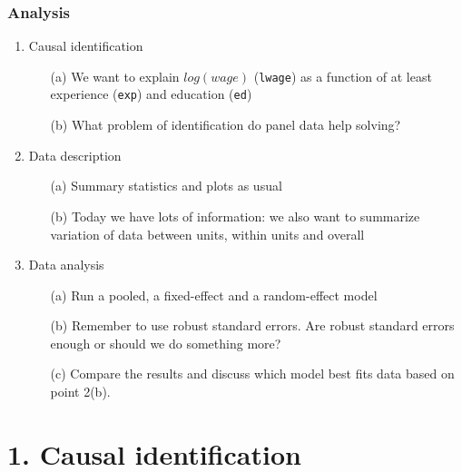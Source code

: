 \documentclass[xcolor=table,dvipsnames]{beamer}
\begin{document}
\begin{frame}
\frametitle{Analysis}
\begin{enumerate}
\item Causal identification \pause
	\begin{itemize}
	\item[(a)] We want to explain $log(wage)$ (\texttt{lwage}) as a function of at least experience (\texttt{exp}) and education (\texttt{ed}) \pause
	\item[(b)] What problem of identification do panel data help solving? \pause
	\end{itemize}
\item Data description \pause
	\begin{itemize}
	\item[(a)] Summary statistics and plots as usual \pause
	\item[(b)] Today we have lots of information: we also want to summarize variation of data between units, within units and overall \pause
	\end{itemize}
\item Data analysis \pause
	\begin{itemize}
	\item[(a)] Run a pooled, a fixed-effect and a random-effect model \pause
	\item[(b)] Remember to use robust standard errors. Are robust standard errors enough or should we do something more? \pause
	\item[(c)] Compare the results and discuss which model best fits data based on point 2(b).
	\end{itemize}
\end{enumerate}
\end{frame}

\section{1. Causal identification}
\end{document}
